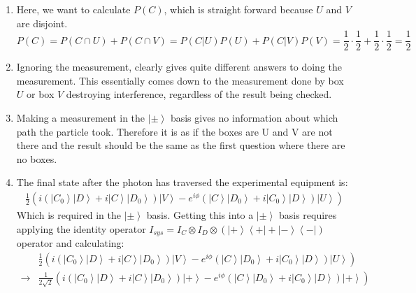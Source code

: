 \documentclass[12pt,a4]{article}
\begin{document}
\begin{enumerate}
\begin{enumerate}
      \item
        Here, we want to calculate $P(C)$, which is straight forward because $U$ and $V$ are disjoint.
        \begin{equation*}
          P(C) = P(C \cap U) + P(C \cap V) = P(C | U) P(U) + P(C | V) P(V) = \frac{1}{2} \cdot \frac{1}{2} + \frac{1}{2}\cdot \frac{1}{2} = \frac{1}{2}
        \end{equation*}
      \item
        Ignoring the measurement, clearly gives quite different answers to doing the measurement.
        This essentially comes down to the measurement done by box $U$ or box $V$ destroying interference, regardless of the result being checked.
      \item
        Making a measurement in the $\left| \pm \right \rangle$ basis gives no information about which path the particle took.
        Therefore it is as if the boxes are U and V are not there and the result should be the same as the first question where there are no boxes.
      \item
        The final state after the photon has traversed the experimental equipment is:
        \begin{align*}
          \frac{1}{2} \left(i\left(\left| C_0 \right \rangle \left| D \right \rangle + i \left| C \right \rangle \left| D_0 \right \rangle\right) \left| V \right \rangle - e^{i \phi}\left( \left| C \right \rangle\left| D_0 \right \rangle + i\left| C_0 \right \rangle \left| D \right \rangle \right) \left| U \right \rangle \right)
        \end{align*}
        Which is required in the $\left| \pm \right\rangle$ basis.
        Getting this into a $\left| \pm \right\rangle$ basis requires applying the identity operator $I_{sys} = I_{C} \otimes I_{D} \otimes \left(\left| + \right\rangle \left\langle + \right| + \left| - \right\rangle \left\langle - \right|\right)$ operator and calculating:
        \begin{align*}
              & \frac{1}{2} \left(i\left(\left| C_0 \right \rangle \left| D \right \rangle + i \left| C \right \rangle \left| D_0 \right \rangle\right) \left| V \right \rangle - e^{i \phi}\left( \left| C \right \rangle\left| D_0 \right \rangle + i\left| C_0 \right \rangle \left| D \right \rangle \right) \left| U \right \rangle \right) \\
          \to & \frac{1}{2\sqrt{2}} \left(i\left(\left| C_0 \right \rangle \left| D \right \rangle + i \left| C \right \rangle \left| D_0 \right \rangle\right) \left| + \right \rangle - e^{i \phi}\left( \left| C \right \rangle\left| D_0 \right \rangle + i\left| C_0 \right \rangle \left| D \right \rangle \right) \left| + \right \rangle \right) \\

\end{align*}
\end{enumerate}
\end{enumerate}
\end{document}

